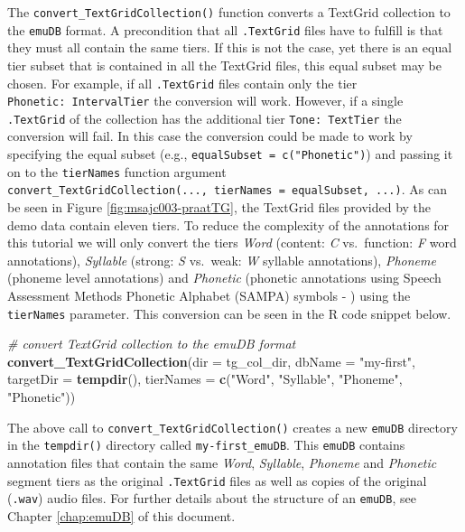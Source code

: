 \documentclass[]{book}
\newenvironment{Shaded}{\begin{snugshade}}{\end{snugshade}}
\newcommand{\CommentTok}[1]{\textcolor[rgb]{0.56,0.35,0.01}{\textit{#1}}}
\newcommand{\DataTypeTok}[1]{\textcolor[rgb]{0.13,0.29,0.53}{#1}}
\newcommand{\KeywordTok}[1]{\textcolor[rgb]{0.13,0.29,0.53}{\textbf{#1}}}
\newcommand{\NormalTok}[1]{#1}
\newcommand{\StringTok}[1]{\textcolor[rgb]{0.31,0.60,0.02}{#1}}
\theoremstyle{definition}
\theoremstyle{definition}
\theoremstyle{definition}
\theoremstyle{remark}
\begin{document}
The \texttt{convert\_TextGridCollection()} function converts a TextGrid
collection to the \texttt{emuDB} format. A precondition that all
\texttt{.TextGrid} files have to fulfill is that they must all contain
the same tiers. If this is not the case, yet there is an equal tier
subset that is contained in all the TextGrid files, this equal subset
may be chosen. For example, if all \texttt{.TextGrid} files contain only
the tier \texttt{Phonetic:\ IntervalTier} the conversion will work.
However, if a single \texttt{.TextGrid} of the collection has the
additional tier \texttt{Tone:\ TextTier} the conversion will fail. In
this case the conversion could be made to work by specifying the equal
subset (e.g., \texttt{equalSubset\ =\ c("Phonetic")}) and passing it on
to the \texttt{tierNames} function argument
\texttt{convert\_TextGridCollection(...,\ tierNames\ =\ equalSubset,\ ...)}.
As can be seen in Figure \ref{fig:msajc003-praatTG}, the TextGrid files
provided by the demo data contain eleven tiers. To reduce the complexity
of the annotations for this tutorial we will only convert the tiers
\emph{Word} (content: \emph{C} vs.~function: \emph{F} word annotations),
\emph{Syllable} (strong: \emph{S} vs.~weak: \emph{W} syllable
annotations), \emph{Phoneme} (phoneme level annotations) and
\emph{Phonetic} (phonetic annotations using Speech Assessment Methods
Phonetic Alphabet (SAMPA) symbols - \citet{wells:1997aa}) using the
\texttt{tierNames} parameter. This conversion can be seen in the R code
snippet below.

\begin{Shaded}
\begin{Highlighting}[]
\CommentTok{# convert TextGrid collection to the emuDB format}
\KeywordTok{convert_TextGridCollection}\NormalTok{(}\DataTypeTok{dir =}\NormalTok{ tg_col_dir,}
                           \DataTypeTok{dbName =} \StringTok{"my-first"}\NormalTok{,}
                           \DataTypeTok{targetDir =} \KeywordTok{tempdir}\NormalTok{(),}
                           \DataTypeTok{tierNames =} \KeywordTok{c}\NormalTok{(}\StringTok{"Word"}\NormalTok{, }\StringTok{"Syllable"}\NormalTok{,}
                                         \StringTok{"Phoneme"}\NormalTok{, }\StringTok{"Phonetic"}\NormalTok{))}
\end{Highlighting}
\end{Shaded}

The above call to \texttt{convert\_TextGridCollection()} creates a new
\texttt{emuDB} directory in the \texttt{tempdir()} directory called
\texttt{my-first\_emuDB}. This \texttt{emuDB} contains annotation files
that contain the same \emph{Word}, \emph{Syllable}, \emph{Phoneme} and
\emph{Phonetic} segment tiers as the original \texttt{.TextGrid} files
as well as copies of the original (\texttt{.wav}) audio files. For
further details about the structure of an \texttt{emuDB}, see Chapter
\ref{chap:emuDB} of this document.
\end{document}
